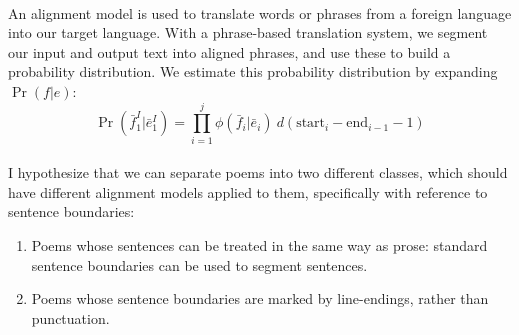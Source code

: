 \paragraph{}{An alignment model is used to translate words or phrases
  from a foreign language into our target language. With a phrase-based
  translation system, we segment our input and output text into
  aligned phrases, and use these to build a probability
  distribution. We estimate this probability distribution by expanding $\Pr(f|e)$:
  $$\Pr(\bar{f}_1^I | \bar{e}_1^I) = \prod_{i=1}^j
  \phi(\bar{f}_i | \bar{e}_i) \ d(\text{start}_i - \text{end}_{i-1} -
  1) $$}
\paragraph{}{I hypothesize that we can separate poems into two
  different classes, which should have different alignment models
  applied to them, specifically with reference to sentence
  boundaries:}
\begin{enumerate}
\item Poems whose sentences can be treated in the same way as prose: standard sentence boundaries can be used to segment sentences.
\item Poems whose sentence boundaries are marked by line-endings,
  rather than punctuation.
\end{enumerate}

